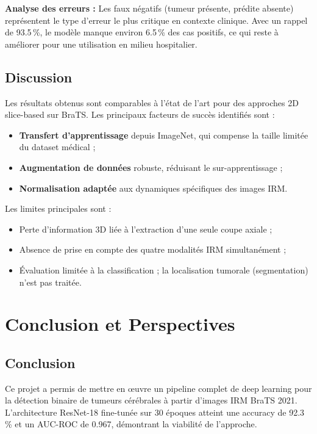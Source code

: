 \documentclass[12pt, a4paper]{report}
\begin{document}
\textbf{Analyse des erreurs :} Les faux négatifs (tumeur présente, prédite absente)
représentent le type d'erreur le plus critique en contexte clinique.
Avec un rappel de 93.5\,\%, le modèle manque environ 6.5\,\% des cas positifs,
ce qui reste à améliorer pour une utilisation en milieu hospitalier.

\section{Discussion}

Les résultats obtenus sont comparables à l'état de l'art pour des approches
2D slice-based sur BraTS. Les principaux facteurs de succès identifiés sont :

\begin{itemize}
  \item \textbf{Transfert d'apprentissage} depuis ImageNet, qui compense la taille
        limitée du dataset médical ;
  \item \textbf{Augmentation de données} robuste, réduisant le sur-apprentissage ;
  \item \textbf{Normalisation adaptée} aux dynamiques spécifiques des images IRM.
\end{itemize}

Les limites principales sont :
\begin{itemize}
  \item Perte d'information 3D liée à l'extraction d'une seule coupe axiale ;
  \item Absence de prise en compte des quatre modalités IRM simultanément ;
  \item Évaluation limitée à la classification ; la localisation tumorale
        (segmentation) n'est pas traitée.
\end{itemize}

\chapter{Conclusion et Perspectives}
\label{chap:conclusion}

\section{Conclusion}

Ce projet a permis de mettre en œuvre un pipeline complet de deep learning
pour la détection binaire de tumeurs cérébrales à partir d'images IRM BraTS 2021.
L'architecture ResNet-18 fine-tunée sur 30 époques atteint une accuracy de 92.3\,\%
et un AUC-ROC de 0.967, démontrant la viabilité de l'approche.
\end{document}
